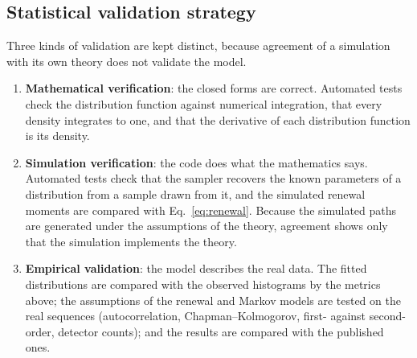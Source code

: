 \documentclass[11pt,a4paper]{article}
\numberwithin{equation}{section}
\begin{document}
\subsection{Statistical validation strategy}\label{sec:valstrat}
Three kinds of validation are kept distinct, because agreement of a simulation with its own theory does not validate the model.
\begin{enumerate}
  \item \textbf{Mathematical verification}: the closed forms are correct. Automated tests check the distribution function against numerical integration, that every density integrates to one,
        and that the derivative of each distribution function is its density.
  \item \textbf{Simulation verification}: the code does what the mathematics says. Automated tests check that the sampler recovers the known parameters of a distribution from a sample drawn from it, and the simulated renewal moments are
        compared with Eq.~\eqref{eq:renewal}. Because the simulated paths are generated under the assumptions of the theory, agreement shows only that the simulation implements the theory.
  \item \textbf{Empirical validation}: the model describes the real data. The fitted distributions are compared with the observed histograms by the metrics above; the assumptions of
        the renewal and Markov models are tested on the real sequences (autocorrelation, Chapman--Kolmogorov, first- against second-order, detector counts); and the results are compared with the published ones.
\end{enumerate}
\end{document}
